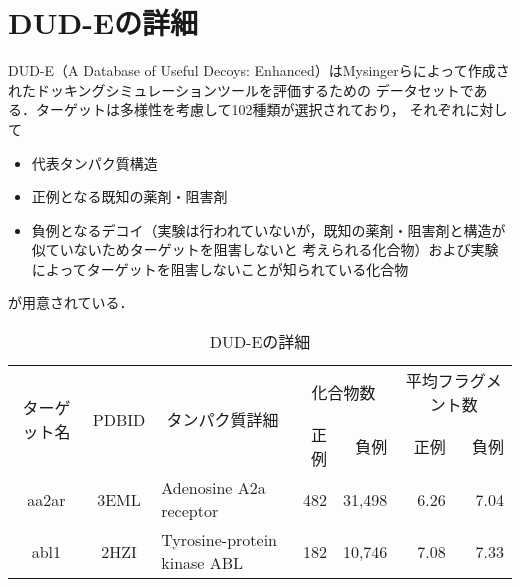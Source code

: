 \appendix
\chapter{DUD-Eの詳細}\label{appendix:dude}
DUD-E（A Database of Useful Decoys: Enhanced）はMysingerらによって作成されたドッキングシミュレーションツールを評価するための
データセットである\cite{Mysinger2012}．ターゲットは多様性を考慮して102種類が選択されており，
それぞれに対して
\begin{itemize}
\item 代表タンパク質構造
\item 正例となる既知の薬剤・阻害剤
\item 負例となるデコイ（実験は行われていないが，既知の薬剤・阻害剤と構造が似ていないためターゲットを阻害しないと
	考えられる化合物）および実験によってターゲットを阻害しないことが知られている化合物
\end{itemize}
が用意されている．
\begin{table}[htb] \centering
	\caption{DUD-Eの詳細}
	\label{tb:dude_description}
	\begin{tabular}{c|c|p{5cm}|rr|rr}
	\hline
	\multirow{2}{*}{ターゲット名}	&\multirow{2}{*}{PDBID}	&\multicolumn{1}{c|}{\multirow{2}{*}{タンパク質詳細}}	&\multicolumn{2}{c|}{化合物数}	&\multicolumn{2}{c}{平均フラグメント数}		\\
							&					&											&正例	&負例				&正例	&負例						\\ \hline
	aa2ar					&3EML				&Adenosine A2a receptor						&482	&31,498				&6.26	&7.04						\\
	abl1						&2HZI				&Tyrosine-protein kinase ABL					&182	&10,746				&7.08	&7.33						\\ \hline
	\end{tabular}
\end{table}

